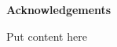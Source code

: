 \begingroup
\makeatletter

\thispagestyle{plain}
\setlength{\parindent}{0pt}
\linespread{1.5}
\fontsize{12pt}{14pt} \selectfont

{\Huge\bf Acknowledgements}
\vspace{4pt}


Put content here


%
\pagebreak

\endgroup
\makeatother
